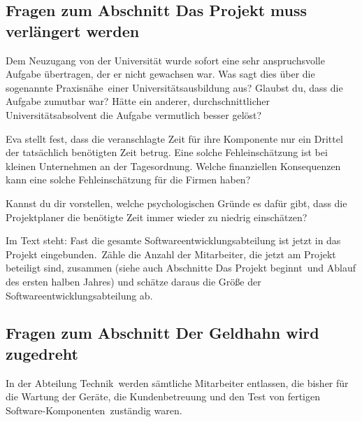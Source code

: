 \subsection*{Fragen zum Abschnitt \glqq Das Projekt muss verlängert werden\grqq}
\begin{compactenum}[a)]
\item Dem Neuzugang von der Universität wurde sofort eine sehr anspruchsvolle
Aufgabe übertragen, der er nicht gewachsen war. Was sagt dies über die
sogenannte \glqq Praxisnähe\grqq\ einer Universitätsausbildung aus? Glaubst du,
dass die Aufgabe zumutbar war? Hätte ein anderer, durchschnittlicher
Universitätsabsolvent die Aufgabe vermutlich besser gelöst?
\item Eva stellt fest, dass die veranschlagte Zeit für ihre Komponente nur ein
Drittel der tatsächlich benötigten Zeit betrug. Eine solche Fehleinschätzung
ist bei kleinen Unternehmen an der Tagesordnung. Welche finanziellen
Konsequenzen kann eine solche Fehleinschätzung für die Firmen haben?

Kannst du dir vorstellen, welche psychologischen Gründe es dafür gibt, dass die
Projektplaner die benötigte Zeit immer wieder zu niedrig einschätzen? 
\item Im Text steht: \glqq Fast die gesamte Softwareentwicklungsabteilung ist
jetzt in das Projekt eingebunden.\grqq\ Zähle die Anzahl der Mitarbeiter, die
jetzt am Projekt beteiligt sind, zusammen (siehe auch Abschnitte \glqq Das
Projekt beginnt\grqq\ und \glqq Ablauf des ersten halben Jahres\grqq ) und
schätze daraus die Größe der Softwareentwicklungsabteilung ab.
\end{compactenum}

\subsection*{Fragen zum Abschnitt \glqq Der Geldhahn wird zugedreht\grqq}

In der Abteilung \glqq Technik\grqq\ werden sämtliche Mitarbeiter entlassen,
die bisher für \glqq die Wartung der Geräte, die Kundenbetreuung und den Test
von fertigen Software-Komponenten\grqq\ zuständig waren.

